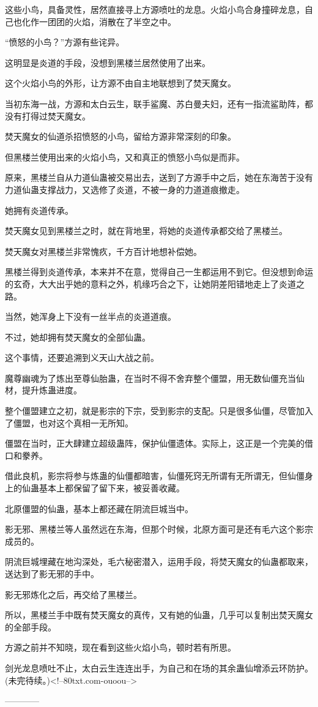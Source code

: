 \begin{this_body}
这些小鸟，具备灵性，居然直接寻上方源喷吐的龙息。火焰小鸟合身撞碎龙息，自己也化作一团团的火焰，消散在了半空之中。

“愤怒的小鸟？”方源有些诧异。

这明显是炎道的手段，没想到黑楼兰居然使用了出来。

这个火焰小鸟的外形，让方源不由自主地联想到了焚天魔女。

当初东海一战，方源和太白云生，联手鲨魔、苏白曼夫妇，还有一指流鲨助阵，都没有打得过焚天魔女。

焚天魔女的仙道杀招愤怒的小鸟，留给方源非常深刻的印象。

但黑楼兰使用出来的火焰小鸟，又和真正的愤怒小鸟似是而非。

原来，黑楼兰自从力道仙蛊被交易出去，送到了方源手中之后，她在东海苦于没有力道仙蛊支撑战力，又选修了炎道，不被一身的力道道痕撤走。

她拥有炎道传承。

焚天魔女见到黑楼兰之时，就在背地里，将她的炎道传承都交给了黑楼兰。

焚天魔女对黑楼兰非常愧疚，千方百计地想补偿她。

黑楼兰得到炎道传承，本来并不在意，觉得自己一生都运用不到它。但没想到命运的玄奇，大大出乎她的意料之外，机缘巧合之下，让她阴差阳错地走上了炎道之路。

当然，她浑身上下没有一丝半点的炎道道痕。

不过，她却拥有焚天魔女的全部仙蛊。

这个事情，还要追溯到义天山大战之前。

魔尊幽魂为了炼出至尊仙胎蛊，在当时不得不舍弃整个僵盟，用无数仙僵充当仙材，提升炼蛊进度。

整个僵盟建立之初，就是影宗的下宗，受到影宗的支配。只是很多仙僵，尽管加入了僵盟，也对这个真相一无所知。

僵盟在当时，正大肆建立超级蛊阵，保护仙僵遗体。实际上，这正是一个完美的借口和豢养。

借此良机，影宗将参与炼蛊的仙僵都暗害，仙僵死窍无所谓有无所谓无，但仙僵身上的仙蛊基本上都保留了留下来，被妥善收藏。

北原僵盟的仙蛊，基本上都还藏在阴流巨城当中。

影无邪、黑楼兰等人虽然远在东海，但那个时候，北原方面可是还有毛六这个影宗成员的。

阴流巨城埋藏在地沟深处，毛六秘密潜入，运用手段，将焚天魔女的仙蛊都取来，送达到了影无邪的手中。

影无邪炼化之后，再交给了黑楼兰。

所以，黑楼兰手中既有焚天魔女的真传，又有她的仙蛊，几乎可以复制出焚天魔女的全部手段。

方源之前并不知晓，现在看到这些火焰小鸟，顿时若有所思。

剑光龙息喷吐不止，太白云生连连出手，为自己和在场的其余蛊仙增添云环防护。(未完待续。)<!--80txt.com-ouoou-->

------------

\end{this_body}

